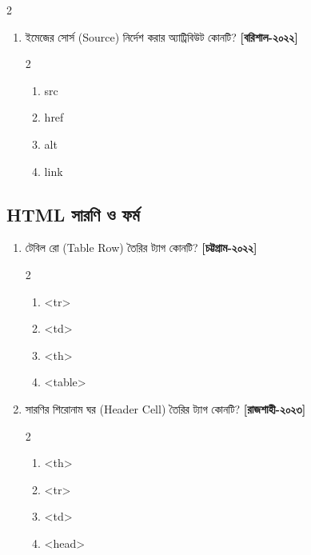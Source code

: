 \begin{multicols}{2}
\begin{enumerate}[resume=chFourFinalQuestions]
\item \begin{minipage}[t]{\linewidth}
ইমেজের সোর্স (Source) নির্দেশ করার অ্যাট্রিবিউট কোনটি? \textbf{[বরিশাল-২০২২]}
\begin{multicols}{2}
\begin{enumerate}[label=\alph*)]
\item src 
\item href
\item alt
\item link
\end{enumerate}
\end{multicols}
\par\addvspace{2pt}


\end{minipage}

\end{enumerate}

\subsection*{HTML সারণি ও ফর্ম}

\begin{enumerate}[resume=chFourFinalQuestions]

\item \begin{minipage}[t]{\linewidth}
টেবিল রো (Table Row) তৈরির ট্যাগ কোনটি? \textbf{[চট্টগ্রাম-২০২২]}
\begin{multicols}{2}
\begin{enumerate}[label=\alph*)]
\item <tr> 
\item <td>
\item <th>
\item <table>
\end{enumerate}
\end{multicols}
\par\addvspace{2pt}


\end{minipage}

\item \begin{minipage}[t]{\linewidth}
সারণির শিরোনাম ঘর (Header Cell) তৈরির ট্যাগ কোনটি? \textbf{[রাজশাহী-২০২৩]}
\begin{multicols}{2}
\begin{enumerate}[label=\alph*)]
\item <th> 
\item <tr>
\item <td>
\item <head>
\end{enumerate}
\end{multicols}
\par\addvspace{2pt}



\end{minipage}
\end{enumerate}
\end{multicols}

